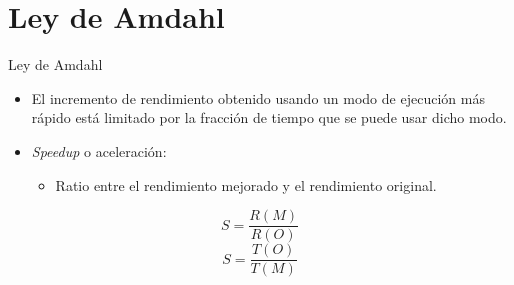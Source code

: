 \section{Ley de Amdahl}

\begin{frame}[t]{Ley de Amdahl}
\begin{itemize}
  \item El incremento de rendimiento obtenido usando un modo
        de ejecución más rápido está limitado por la fracción de
        tiempo que se puede usar dicho modo.
  \item \emph{Speedup} o aceleración:
    \begin{itemize}
      \item Ratio entre el rendimiento mejorado y el rendimiento original.
    \end{itemize}
\end{itemize}
\begin{displaymath}
S = \frac{R(M)}{R(O)}
\end{displaymath}
\begin{displaymath}
S = \frac{T(O)}{T(M)}
\end{displaymath}
\end{frame}


